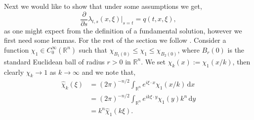 \documentclass[a4paper, 12pt]{report}
\theoremstyle{cor}
\theoremstyle{remark}
\theoremstyle{definition}
\begin{document}
Next we would like to show that under some assumptions we get,
\begin{equation}
\frac{\partial}{\partial s}\lambda_{t, s}(x, \xi)\bigg|_{s = t} = q(t, x, \xi),
\end{equation}
as one might expect from the definition of a fundamental solution, however we first need some lemmas.  For the rest of the section we follow \cite{Conservative}.  Consider a function $\chi_1 \in C_0^\infty(\mathbb{R}^n)$ such that $\chi_{B_1(0)} \le \chi_1 \le \chi_{B_2(0)}$, where $B_r(0)$ is the standard Euclidean ball of radius $r > 0$ in $\mathbb{R}^n$.  We set $\chi_k(x) := \chi_1(x/k)$, then clearly $\chi_k \to 1$ as $k \to \infty$ and we note that,
$$
\begin{aligned}
\hat{\chi}_k(\xi) & = (2\pi)^{-n/2}\int_{\mathbb{R}^n}e^{i\xi\cdot x}\chi_1(x/k)\,\mathrm{d}x\\
& = (2\pi)^{-n/2}\int_{\mathbb{R}^n}e^{ik\xi\cdot y}\chi_1(y)k^n\,\mathrm{d}y\\
& = k^n\hat{\chi}_1(k\xi).
\end{aligned}
$$
\end{document}
